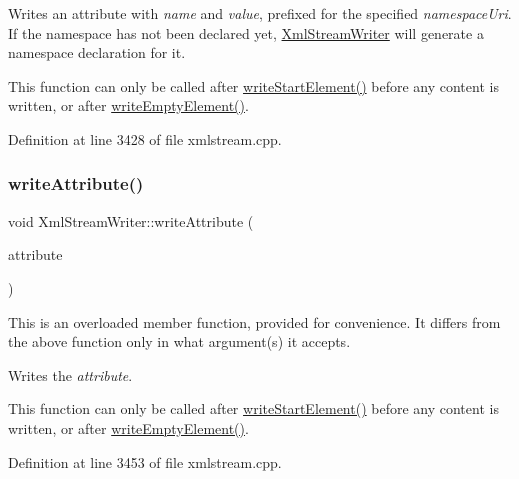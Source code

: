 Writes an attribute with {\itshape name} and {\itshape value}, prefixed for the specified {\itshape namespace\+Uri}. If the namespace has not been declared yet, \hyperlink{class_xml_stream_writer}{Xml\+Stream\+Writer} will generate a namespace declaration for it.

This function can only be called after \hyperlink{class_xml_stream_writer_aa001c660c1df012b4e37773aa219c379}{write\+Start\+Element()} before any content is written, or after \hyperlink{class_xml_stream_writer_a07e058f896327e9236e7c19132842cf2}{write\+Empty\+Element()}. 

Definition at line 3428 of file xmlstream.\+cpp.

\mbox{\label{class_xml_stream_writer_aaa0061750c74a393ab443af6ddd06db5}} 
\subsubsection{\texorpdfstring{write\+Attribute()}{writeAttribute()}\hspace{0.1cm}{\footnotesize\ttfamily [3/3]}}
{\footnotesize\ttfamily void Xml\+Stream\+Writer\+::write\+Attribute (\begin{DoxyParamCaption}\item[{const \hyperlink{class_xml_stream_attribute}{Xml\+Stream\+Attribute} \&}]{attribute }\end{DoxyParamCaption})}

This is an overloaded member function, provided for convenience. It differs from the above function only in what argument(s) it accepts.

Writes the {\itshape attribute}.

This function can only be called after \hyperlink{class_xml_stream_writer_aa001c660c1df012b4e37773aa219c379}{write\+Start\+Element()} before any content is written, or after \hyperlink{class_xml_stream_writer_a07e058f896327e9236e7c19132842cf2}{write\+Empty\+Element()}. 

Definition at line 3453 of file xmlstream.\+cpp.

\mbox{\label{class_xml_stream_writer_a401845495b28fcc27a7f491ac402ea47}} 
